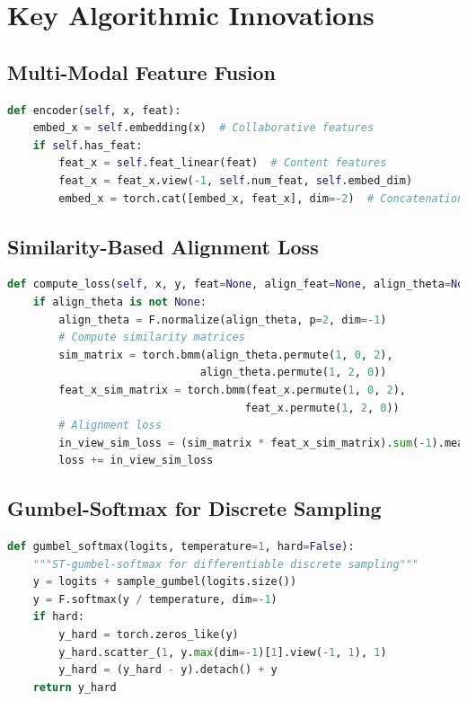 \section{Key Algorithmic Innovations}

\subsection{Multi-Modal Feature Fusion}

\begin{lstlisting}[language=Python, caption=Feature Fusion Mechanism]
def encoder(self, x, feat):
    embed_x = self.embedding(x)  # Collaborative features
    if self.has_feat:
        feat_x = self.feat_linear(feat)  # Content features
        feat_x = feat_x.view(-1, self.num_feat, self.embed_dim)
        embed_x = torch.cat([embed_x, feat_x], dim=-2)  # Concatenation
\end{lstlisting}

\subsection{Similarity-Based Alignment Loss}

\begin{lstlisting}[language=Python, caption=Alignment Loss Computation]
def compute_loss(self, x, y, feat=None, align_feat=None, align_theta=None):
    if align_theta is not None:
        align_theta = F.normalize(align_theta, p=2, dim=-1)
        # Compute similarity matrices
        sim_matrix = torch.bmm(align_theta.permute(1, 0, 2), 
                              align_theta.permute(1, 2, 0))
        feat_x_sim_matrix = torch.bmm(feat_x.permute(1, 0, 2), 
                                     feat_x.permute(1, 2, 0))
        # Alignment loss
        in_view_sim_loss = (sim_matrix * feat_x_sim_matrix).sum(-1).mean()
        loss += in_view_sim_loss
\end{lstlisting}

\subsection{Gumbel-Softmax for Discrete Sampling}

\begin{lstlisting}[language=Python, caption=Gumbel-Softmax Implementation]
def gumbel_softmax(logits, temperature=1, hard=False):
    """ST-gumbel-softmax for differentiable discrete sampling"""
    y = logits + sample_gumbel(logits.size())
    y = F.softmax(y / temperature, dim=-1)
    if hard:
        y_hard = torch.zeros_like(y)
        y_hard.scatter_(1, y.max(dim=-1)[1].view(-1, 1), 1)
        y_hard = (y_hard - y).detach() + y
    return y_hard
\end{lstlisting}

